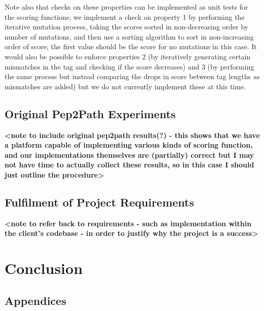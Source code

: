 \documentclass{l4proj}
\begin{document}
Note also that checks on these properties can be implemented as unit tests for the scoring functions; we implement a check on property 1 by performing the iterative mutation process, taking the scores sorted in non-decreasing order by number of mutations, and then use a sorting algorithm to sort in non-increasing order of score; the first value should be the score for no mutations in this case. It would also be possible to enforce properties 2 (by iteratively generating certain mismatches in the tag and checking if the score decreases) and 3 (by performing the same process but instead comparing the drops in score between tag lengths as mismatches are added) but we do not currently implement these at this time.

\section{Original Pep2Path Experiments}

\textbf{<note to include original pep2path results(?) - this shows that we have a platform capable of implementing various kinds of scoring function, and our implementations themselves are (partially) correct but I may not have time to actually collect these results, so in this case I should just outline the procedure>}

\section{Fulfilment of Project Requirements}

\textbf{<note to refer back to requirements - such as implementation within the client's codebase - in order to justify why the project is a success>}

\chapter{Conclusion}    

%
% 

\begin{appendices}

\chapter{Appendices}

\end{appendices}






\end{document}
